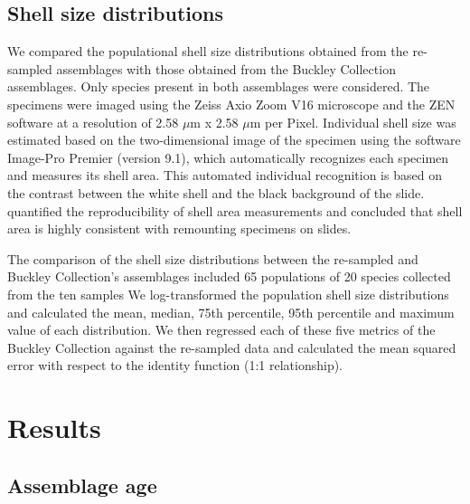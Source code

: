 \documentclass[a4paper]{article}
\begin{document}
\subsection{Shell size distributions}

We compared the populational shell size distributions obtained from the re-sampled assemblages with those obtained from the Buckley Collection assemblages. Only species present in both assemblages were considered. %
The specimens were imaged using the Zeiss Axio Zoom V16 microscope and the ZEN software at a resolution of 2.58 $\mu$m x 2.58 $\mu$m per Pixel. Individual shell size was estimated based on the two-dimensional image of the specimen using the software Image-Pro Premier (version 9.1), which automatically recognizes each specimen and measures its shell area. This automated individual recognition is based on the contrast between the white shell and the black background of the slide. \cite{brombacher2017calibration} quantified the reproducibility of shell area measurements and concluded that shell area is highly consistent with remounting specimens on slides. 

The comparison of the shell size distributions between the re-sampled and Buckley Collection's assemblages included 65 populations of 20 species collected from the ten samples %
We log-transformed the population shell size distributions and calculated the mean, median, 75th percentile, 95th percentile and maximum value of each distribution. We then regressed each of these five metrics of the Buckley Collection against the re-sampled data and calculated the mean squared error with respect to the identity function (1:1 relationship).




\section{Results}


\subsection{Assemblage age}
\end{document}
